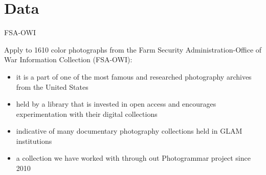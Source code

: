 \documentclass[12pt,ignorenonframetext,aspectratio=169]{beamer}
\begin{document}
\section{Data}
%
%
%
%
%
%
%
%
%
%
%
%
%
%
%
%

\begin{frame}{FSA-OWI}

Apply to 1610 color photographs from the Farm Security Administration-Office of War
Information Collection (FSA-OWI):

\begin{itemize}
\item it is a part of one of the most famous and researched photography archives from the United States  \pause
\item held by a library that is invested in open access and
encourages experimentation with their digital collections  \pause
\item indicative of many documentary photography collections held in GLAM
institutions  \pause
\item a collection we have worked with through out Photogrammar project since 2010
\end{itemize}

\end{frame}
\end{document}

